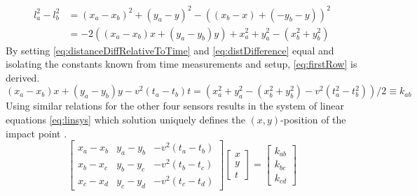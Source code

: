 	\begin{equation}
		\begin{split}
			l_a^2 - l_b^2 & = (x_a - x_b)^2 + (y_a - y)^2 - ((x_b-x)+(-y_b - y))^2 \\
			& = -2( (x_a - x_b) x + (y_a - y_b) y ) + x_a^2 +y_a^2 -(x_b^2 + y_b^2)
		\end{split}
		\label{eq:distDifference}
	\end{equation}
	By setting \eqref{eq:distanceDiffRelativeToTime} and \eqref{eq:distDifference} equal and isolating the constants known from time measurements and setup, \eqref{eq:firstRow} is derived.
	\begin{equation}
		(x_a - x_b) x + (y_a - y_b) y - v^2(t_a - t_b) t = (x_a^2 +y_a^2 -(x_b^2 + y_b^2) - v^2(t_a^2 - t_b^2))/2 \equiv k_{ab}
		\label{eq:firstRow}
	\end{equation}
	Using similar relations for the other four sensors results in the system of linear equations \eqref{eq:linsys} which solution uniquely defines the $(x,y)$-position of the impact point \cite{tdoa_notes}.
	\begin{equation}
		\begin{bmatrix}
			x_a - x_b & y_a - y_b & - v^2(t_a - t_b) \\
			x_b - x_c & y_b - y_c & - v^2(t_b - t_c) \\
			x_c - x_d & y_c - y_d & - v^2(t_c - t_d)
		 \end{bmatrix}
		 \left[ \begin{array}{c} x \\ y \\ t \end{array} \right] = \left[ \begin{array}{c} k_{ab} \\ k_{bc} \\ k_{cd}\end{array} \right]
		 \label{eq:linsys}
	\end{equation}
